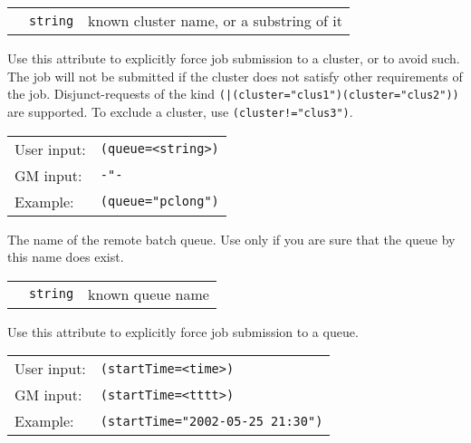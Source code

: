   \begin{tabular}{llp{10cm}}
    \hspace*{1cm}&\texttt{string} & known cluster name, or a substring of it\\
  \end{tabular}

  Use this attribute to explicitly force job submission to a cluster,
  or to avoid such. The job will not be submitted if the cluster does
  not satisfy other requirements of the job. Disjunct-requests of the
  kind \verb#(|(cluster="clus1")(cluster="clus2"))# are supported. To
  exclude a cluster, use \verb#(cluster!="clus3")#.

  \hspace*{0.5cm}
  \begin{shaded}
  \end{shaded}
  \begin{tabular}{lp{13cm}}
    User input:&\verb#(queue=<string>)#\\
    GM input:&\verb#-"-#\\
    Example:&\verb#(queue="pclong")#\\
  \end{tabular}
  
  The name of the remote batch queue. Use only if you are sure that
  the queue by this name does exist.

  \begin{tabular}{llp{10cm}}
    \hspace*{1cm}&\texttt{string} & known queue name\\
  \end{tabular}

  Use this attribute to explicitly force job submission to a queue.

  \hspace*{0.5cm}
  \begin{shaded}
  \end{shaded}
  \begin{tabular}{lp{13cm}}
    User input:&\verb#(startTime=<time>)#\\
    GM input:&\verb#(startTime=<tttt>)#\\
    Example:&\verb#(startTime="2002-05-25 21:30")#\\
  \end{tabular}

